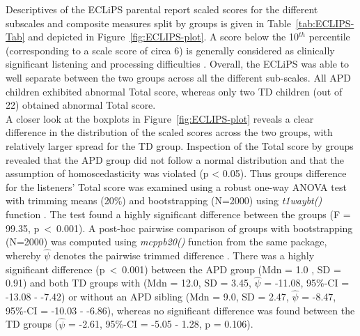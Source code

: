 \documentclass[a4paper, twoside]{templates/ociamthesis}
\begin{document}
Descriptives of the ECLiPS parental report scaled scores for the different subscales and composite measures split by groups is given in Table~\ref{tab:ECLIPS-Tab} and depicted in Figure~\ref{fig:ECLIPS-plot}. A score below the 10\(^{th}\) percentile (corresponding to a scale score of circa 6) is generally considered as clinically significant listening and processing difficulties \autocite{Barry2014}. Overall, the ECLiPS was able to well separate between the two groups across all the different sub-scales. All APD children exhibited abnormal Total score, whereas only two TD children (out of 22) obtained abnormal Total score.\\

A closer look at the boxplots in Figure~\ref{fig:ECLIPS-plot} reveals a clear difference in the distribution of the scaled scores across the two groups, with relatively larger spread for the TD group. Inspection of the Total score by groups revealed that the APD group did not follow a normal distribution and that the assumption of homoscedasticity was violated (p \textless{} 0.05). Thus groups difference for the listeners' Total score was examined using a robust one-way ANOVA test with trimming means (20\%) and bootstrapping (N=2000) using \emph{t1waybt()} function \autocite[WRS2 package;][]{WRS2PackageR}. The test found a highly significant difference between the groups (F = 99.35, p~\textless~0.001). A post-hoc pairwise comparison of groups with bootstrapping (N=2000) was computed using \emph{mcppb20()} function from the same package, whereby \(\hat{\psi}\) denotes the pairwise trimmed difference \autocite{WRS2PackageR}. There was a highly significant difference (p~\textless~0.001) between the APD group (Mdn = 1.0 , SD = 0.91) and both TD groups with (Mdn = 12.0, SD = 3.45, \(\hat{\psi}\) = -11.08, 95\%-CI = -13.08 - -7.42) or without an APD sibling (Mdn = 9.0, SD = 2.47, \(\hat{\psi}\) = -8.47, 95\%-CI = -10.03 - -6.86), whereas no significant difference was found between the TD groups (\(\hat{\psi}\) = -2.61, 95\%-CI = -5.05 - 1.28, p = 0.106).\\
\end{document}
